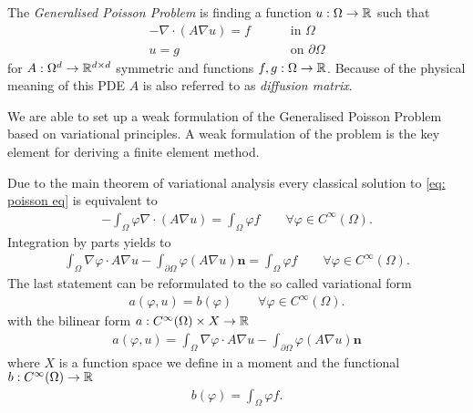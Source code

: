 
\begin{definition}
The \emph{Generalised Poisson Problem} is finding a function $u:\Omega \rightarrow \mathbb{R}$ such that 
\begin{align}
	-\nabla \cdot (A \nabla u) = f \qquad &\text{ in }\Omega \label{eq: poisson eq} \\
	u = g \qquad &\text{ on } \partial \Omega    \label{eq: poisson bc}
\end{align}
for $ A:\Omega^d \rightarrow \mathbb{R}^{d \times d}$ symmetric and functions $f,g:\Omega \rightarrow \mathbb{R} $. 
Because of the physical meaning of this PDE $A$ is also referred to as \emph{diffusion matrix}.
\end{definition}

We are able to set up a weak formulation of the Generalised Poisson Problem based on variational principles. A weak formulation of the problem is the key element for deriving a finite element method.

Due to the main theorem of variational analysis every classical solution to \eqref{eq: poisson eq} is equivalent to 
\begin{align}
	-\int_\Omega \varphi \nabla \cdot (A \nabla u) = \int_\Omega \varphi f \qquad \forall \varphi \in C^\infty(\Omega).\label{eq: variational form}
\end{align}
Integration by parts yields to
\begin{align}
	\int_\Omega \nabla \varphi  \cdot A\nabla u -\int_{\partial \Omega} \varphi (A\nabla u) \mathbf{n}  = \int_\Omega \varphi f \qquad \forall \varphi \in C^\infty(\Omega). \label{eq: FE integration by parts}
\end{align}
The last statement can be reformulated to the so called variational form 
\begin{align}
a(\varphi,u)  = b(\varphi) \qquad \forall \varphi \in C^\infty(\Omega). \label{eq: variational formulation}
\end{align}
with the bilinear form $a:C^\infty(\Omega) \times X \rightarrow \mathbb{R}$
\begin{align*}
a(\varphi,u) = \int_\Omega \nabla \varphi  \cdot A\nabla u -\int_{\partial \Omega} \varphi (A\nabla u) \mathbf{n}
\end{align*}
where $X$ is a function space we define in a moment and the functional $b:C^\infty(\Omega) \rightarrow \mathbb{R}$
\begin{align*}
 b(\varphi)  = \int_\Omega \varphi f.
\end{align*}



